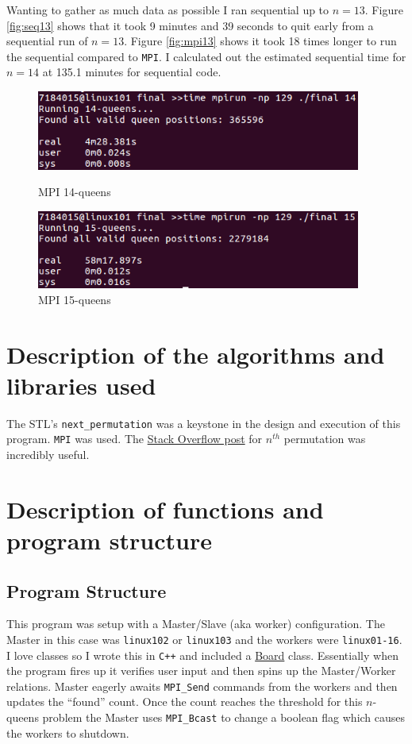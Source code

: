 \documentclass{article}
\begin{document}
Wanting to gather as much data as possible I ran sequential up to $n=13$. Figure 
\ref{fig:seq13} shows that it took 9 minutes and 39 seconds to quit early from a 
sequential run of $n=13$. Figure \ref{fig:mpi13} shows it took 18 times longer 
to run the sequential compared to \verb|MPI|. I calculated out the estimated 
sequential time for $n=14$ at 135.1 minutes for sequential code.

\begin{figure}[h]
    \centering
    \begin{minipage}{0.49\textwidth}
        \centering
        \includegraphics[width=0.95\textwidth]{MPI_14}
        \caption{MPI 14-queens}
        \label{fig:mpi14}
    \end{minipage}\hfill
    \begin{minipage}{0.49\textwidth}
        \centering
        \includegraphics[width=0.95\textwidth]{MPI_15}
        \caption{MPI 15-queens}
        \label{fig:mpi15}
    \end{minipage}
\end{figure}

\section{Description of the algorithms and libraries used}
The STL's \verb|next_permutation| was a keystone in the design and execution of 
this program. \verb|MPI| was used. The 
\href{https://stackoverflow.com/a/7919887}{Stack Overflow post} for $n^{th}$ 
permutation was incredibly useful.

\section{Description of functions and program structure}
\subsection{Program Structure}
This program was setup with a Master/Slave (aka worker) configuration. The 
Master in this case was \verb|linux102| or \verb|linux103| and the workers were 
\verb|linux01-16|. I love classes so I wrote this in \verb|C++| and included a 
\href{}{Board} class. Essentially when the program fires up it verifies user 
input and then spins up the Master/Worker relations. Master eagerly awaits 
\verb|MPI_Send| commands from the workers and then updates the ``found'' count. 
Once the count reaches the threshold for this $n$-queens problem the Master uses 
\verb|MPI_Bcast| to change a boolean flag which causes the workers to shutdown.
\end{document}
